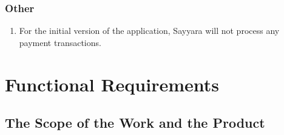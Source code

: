 \documentclass[12pt]{article}
\begin{document}
\subsubsection{Other}
\begin{enumerate}
	\item For the initial version of the application, Sayyara will not process any payment transactions.
\end{enumerate}

\section{Functional Requirements}

\subsection{The Scope of the Work and the Product}
\end{document}

